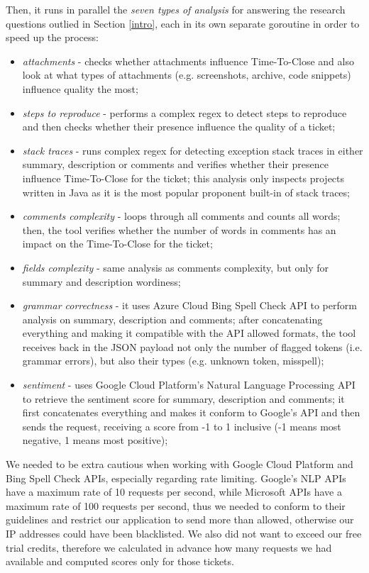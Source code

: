 \documentclass{mpaper}
\begin{document}
Then, it runs in parallel the \emph{seven types of analysis} for answering the research questions outlied in Section \ref{intro}, 
each in its own separate goroutine in order to speed up the process:
\begin{itemize}
  \item \emph{attachments} - checks whether attachments influence Time-To-Close and also look at what types 
  of attachments (e.g. screenshots, archive, code snippets) influence quality the most;
  \item \emph{steps to reproduce} - performs a complex regex to detect steps to reproduce and then checks whether their presence
  influence the quality of a ticket;
  \item \emph{stack traces} - runs complex regex for detecting exception stack traces in either summary, description or comments 
  and verifies whether their presence influence Time-To-Close for the ticket; this analysis only inspects projects
  written in Java as it is the most popular proponent built-in of stack traces;
  \item \emph{comments complexity} - loops through all comments and counts all words; then, the tool verifies whether 
  the number of words in comments has an impact on the Time-To-Close for the ticket;
  \item \emph{fields complexity} - same analysis as comments complexity, but only for summary and description wordiness;
  \item \emph{grammar correctness} - it uses Azure Cloud Bing Spell Check API \cite{bing} to perform analysis on summary, 
  description and comments; after concatenating everything and making it compatible with the API allowed formats, the tool 
  receives back in the JSON payload not only the number of flagged tokens (i.e. grammar errors), but also their types 
  (e.g. unknown token, misspell);
  \item \emph{sentiment} - uses Google Cloud Platform's Natural Language Processing API \cite{gcp_nlp} to retrieve the 
  sentiment score for summary, description and comments; it first concatenates everything and makes it conform to Google's 
  API and then sends the request, receiving a score from -1 to 1 inclusive (-1 means most negative, 1 means most 
  positive);
\end{itemize}

We needed to be extra cautious when working with Google Cloud Platform and Bing Spell Check APIs, especially 
regarding rate limiting. Google's NLP APIs have a maximum rate of 10 requests per second, while Microsoft APIs 
have a maximum rate of  100 requests per second, thus we needed to conform to their guidelines and restrict our 
application to send more than allowed, otherwise our IP addresses could have been blacklisted. We also did not want 
to exceed our free trial credits, therefore we calculated in advance how many requests we had available and computed 
scores only for those tickets. 
\end{document}
